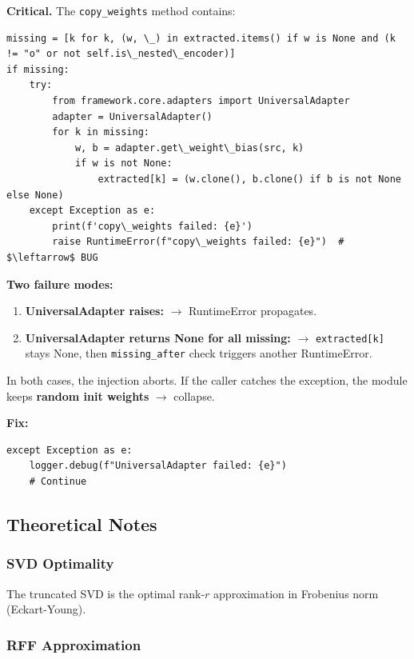 \textbf{Critical.} The \texttt{copy\_weights} method contains:

\begin{lstlisting}
missing = [k for k, (w, \_) in extracted.items() if w is None and (k != "o" or not self.is\_nested\_encoder)]
if missing:
    try:
        from framework.core.adapters import UniversalAdapter
        adapter = UniversalAdapter()
        for k in missing:
            w, b = adapter.get\_weight\_bias(src, k)
            if w is not None:
                extracted[k] = (w.clone(), b.clone() if b is not None else None)
    except Exception as e:
        print(f'copy\_weights failed: {e}')
        raise RuntimeError(f"copy\_weights failed: {e}")  # $\leftarrow$ BUG
\end{lstlisting}

\textbf{Two failure modes:}

\begin{enumerate}
\item \textbf{UniversalAdapter raises:} $\to$ RuntimeError propagates.
\item \textbf{UniversalAdapter returns None for all missing:} $\to$ \texttt{extracted[k]} stays None, then \texttt{missing\_after} check triggers another RuntimeError.

\end{enumerate}
In both cases, the injection aborts. If the caller catches the exception, 
the module keeps \textbf{random init weights} $\to$ collapse.

\textbf{Fix:}

\begin{lstlisting}
except Exception as e:
    logger.debug(f"UniversalAdapter failed: {e}")
    # Continue
\end{lstlisting}

\subsection{Theoretical Notes}

\subsubsection{SVD Optimality}

The truncated SVD is the optimal rank-$r$ approximation in Frobenius norm 
(Eckart-Young).

\subsubsection{RFF Approximation}

